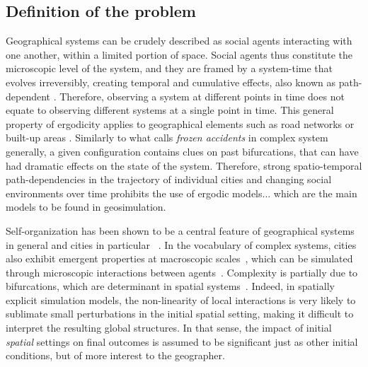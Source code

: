 \documentclass[preprint,5p,times,twocolumn,authoryear]{elsarticle}
\begin{document}
\subsection{Definition of the problem}

Geographical systems can be crudely described as social agents interacting with one another, within a limited portion of space. Social agents thus constitute the microscopic level of the system, and they are framed by a system-time that evolves irreversibly, creating temporal and cumulative effects, also known as path-dependent \citep{arthur1994increasing}. Therefore, observing a system at different points in time does not equate to observing  different systems at a single point in time. This general property of ergodicity applies to geographical elements such as road networks or built-up areas \citep{pumain2003approche}. Similarly to what \citet{gell1995quark} calls \emph{frozen accidents} in complex system generally, a given configuration contains clues on past bifurcations, that can have had dramatic effects on the state of the system. Therefore, strong spatio-temporal path-dependencies in the trajectory of individual cities and changing social environments over time prohibits the use of ergodic models... which are the main models to be found in geosimulation.


Self-organization has been shown to be a central feature of geographical systems in general and cities in particular ~\citep{AllenSanglier1981,saint1989villes, Portugali2000}. In the vocabulary of complex systems, cities also exhibit emergent properties at macroscopic scales~\citep{pumain2006hierarchy, AzizAlaouiBertelle2009}, which can be simulated through microscopic interactions between agents~\citep{Wu2002, Batty2007}. Complexity is partially due to bifurcations, which are determinant in spatial systems~\citep{Wilson1981, Wilson2002}. Indeed, in spatially explicit simulation models, the non-linearity of local interactions is very likely to sublimate small perturbations in the initial spatial setting, making it difficult to interpret the resulting global structures. In that sense, the impact of initial \emph{spatial} settings on final outcomes is assumed to be significant just as other initial conditions, but of more interest to the geographer. \\
\end{document}
